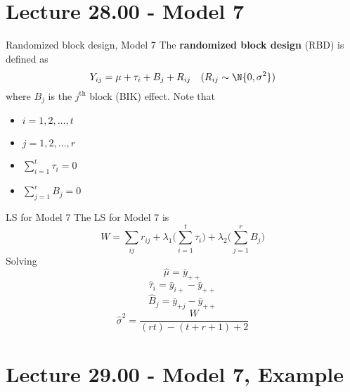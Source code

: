 \section{Lecture 28.00 - Model 7}
\begin{Definition}{Randomized block design, Model 7}{}
    The \textbf{randomized block design} (RBD) is defined as
    \[ Y_{ij}=\mu+\tau_i+B_j+R_{ij}\quad(R_{ij} \sim \N{0,\sigma^2}) \]
    where $ B_j $ is the $ j^{\text{th}} $ block (BIK) effect. Note that
    \begin{itemize}
        \item $ i=1,2,\ldots,t $
        \item $ j=1,2,\ldots,r $
        \item $ \sum_{i=1}^t \tau_i=0  $
        \item $\sum_{j=1}^{r} B_j=0$
    \end{itemize}
\end{Definition}
\begin{Example}{LS for Model 7}{}
    The LS for Model 7 is
    \[ W=\sum_{ij}r_{ij}+\lambda_1\biggl(\sum_{i=1}^{t} \tau_i\biggr)+
        \lambda_2 \biggl(\sum_{j=1}^{r} B_j\biggr)  \]
    Solving
    \[ \hat{\mu}=\bar{y}_{++} \]
    \[ \hat{\tau}_i=\bar{y}_{i+}-\bar{y}_{++} \]
    \[ \hat{B}_j=\bar{y}_{+j}-\bar{y}_{++} \]
    \[ \hat{\sigma}^2=\frac{W}{(rt)-(t+r+1)+2}  \]
\end{Example}

\section{Lecture 29.00 - Model 7, Example}
